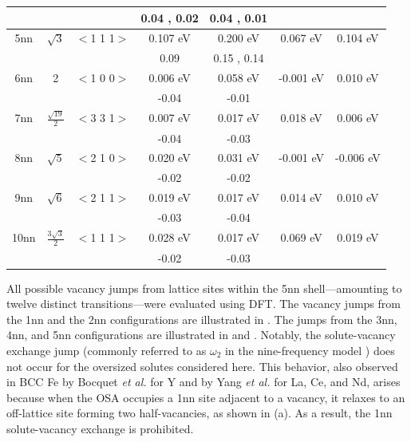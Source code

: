 \documentclass[preprint,12pt]{elsarticle}
\providecommand{\DIFaddend}{\protect\color{black}} %
\DeclareRobustCommand{\DIFaddend}{\DIFOaddend \let\includegraphics\DIFOincludegraphics} %
\begin{document}
\begin{table}[h]
\begin{tabular}{|c|c|c|c|c|c|c|}
       &&&0.04 \cite{yang_significant_2023}, 0.02 \cite{ke2025diffusion} &0.04 \cite{yang_significant_2023}, 0.01 \cite{ke2025diffusion} && \\
       \hline
       5nn &$\sqrt{3}$ & $<$1 1 1$>$  & 0.107 eV&0.200 eV&0.067 eV&0.104 eV\\
       &&&0.09 \cite{ke2025diffusion} &0.15 \cite{yang_significant_2023}, 0.14 \cite{ke2025diffusion} && \\
       \hline
       6nn &2 & $<$1 0 0$>$ &0.006 eV&0.058 eV&-0.001 eV&0.010 eV\\
       &&&-0.04 \cite{ke2025diffusion}& -0.01 \cite{ke2025diffusion} &&\\
       \hline
       7nn &$\frac{\sqrt{19}}{2}$ & $<$3 3 1$>$ &0.007 eV&0.017 eV&0.018 eV&0.006 eV\\
       &&&-0.04 \cite{ke2025diffusion}& -0.03 \cite{ke2025diffusion} &&\\
       \hline
       8nn &$\sqrt{5}$ &$<$2 1 0$>$ &0.020 eV&0.031 eV&-0.001 eV&-0.006 eV\\
       &&&-0.02 \cite{ke2025diffusion}& -0.02 \cite{ke2025diffusion} &&\\
       \hline
       9nn &$\sqrt{6}$ & $<$2 1 1$>$  &0.019 eV&0.017 eV&0.014 eV&0.010 eV\\
       &&&-0.03 \cite{ke2025diffusion}& -0.04 \cite{ke2025diffusion} &&\\
       \hline
      10nn &$\frac{3\sqrt{3}}{2}$ & $<$1 1 1$>$ &0.028 eV&0.017 eV&0.069 eV&0.019 eV\\
      &&&-0.02 \cite{ke2025diffusion} & -0.03 \cite{ke2025diffusion} &&\\
      \hline
    \end{tabular}
    \label{tab:configurations_binding}
\end{table}
\DIFaddend 

\FloatBarrier

All possible vacancy jumps from lattice sites within the 5nn shell—amounting to twelve distinct transitions—were evaluated using DFT. The vacancy jumps from the 1nn and the 2nn configurations are illustrated in . The jumps from the 3nn, 4nn, and 5nn configurations are illustrated in  and . Notably, the solute-vacancy exchange jump (commonly referred to as $\omega_2$ in the nine-frequency model \cite{leclaire1970}) does not occur for the oversized solutes considered here. This behavior, also observed in BCC Fe by Bocquet \textit{et al.} \cite{bocquet_migration_2017} for Y and by Yang \textit{et al.} \cite{yang_significant_2023} for La, Ce, and Nd, arises because when the OSA occupies a 1nn site adjacent to a vacancy, it relaxes to an off-lattice site forming two half-vacancies, as shown in (a). As a result, the 1nn solute-vacancy exchange is prohibited.
\end{document}
